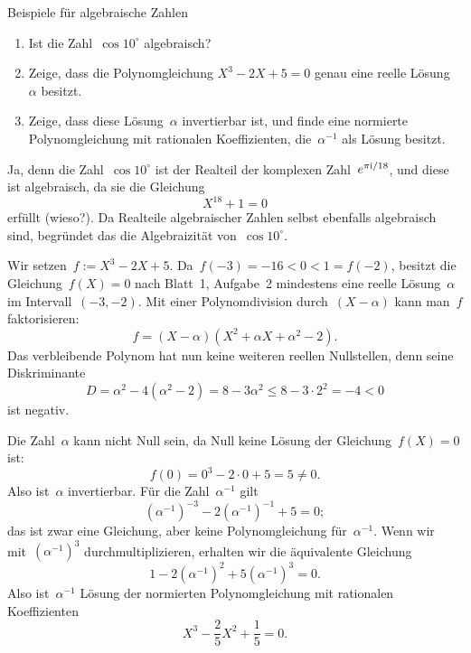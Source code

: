 \documentclass{algblatt}
\begin{document}
\vspace*{-1.5cm}

\begin{aufgabe}{Beispiele für algebraische Zahlen}
\begin{enumerate}
\item Ist die Zahl~$\cos 10^\circ$ algebraisch?
\item Zeige, dass die Polynomgleichung $X^3 - 2X + 5 = 0$ genau eine reelle
Lösung~$\alpha$ besitzt.
\item Zeige, dass diese Lösung~$\alpha$ invertierbar ist, und finde eine normierte
Polynomgleichung mit rationalen Koeffizienten, die~$\alpha^{-1}$ als Lösung besitzt.
\end{enumerate}
\begin{loesungE}
\item Ja, denn die Zahl~$\cos 10^\circ$ ist der Realteil der komplexen
Zahl~$e^{\pi\mathrm{i}/18}$, und diese ist algebraisch, da sie die Gleichung
\[ X^{18} + 1 = 0 \]
erfüllt (wieso?). Da Realteile algebraischer Zahlen selbst ebenfalls
algebraisch sind, begründet das die Algebraizität von~$\cos 10^\circ$.
\item Wir setzen~$f := X^3-2X+5$. Da~$f(-3) =
-16 < 0 < 1 = f(-2)$, besitzt die Gleichung~$f(X) = 0$ nach Blatt~1, Aufgabe~2
mindestens eine reelle Lösung~$\alpha$ im Intervall~$(-3, -2)$. Mit einer Polynomdivision
durch~$(X-\alpha)$ kann man~$f$ faktorisieren:
\[ f = (X - \alpha) (X^2 + \alpha X + \alpha^2-2). \]
Das verbleibende Polynom hat nun keine weiteren reellen Nullstellen, denn seine
Diskriminante
\[ D = \alpha^2 - 4(\alpha^2-2) = 8 - 3 \alpha^2 \leq 8 - 3 \cdot 2^2 = -4 < 0
\]
ist negativ.
\item Die Zahl~$\alpha$ kann nicht Null sein, da Null keine Lösung der
Gleichung~$f(X) = 0$ ist:
\[ f(0) = 0^3 - 2 \cdot 0 + 5 = 5 \neq 0. \]
Also ist~$\alpha$ invertierbar. Für die Zahl~$\alpha^{-1}$ gilt
\[ (\alpha^{-1})^{-3} - 2 (\alpha^{-1})^{-1} + 5 = 0; \]
das ist zwar eine Gleichung, aber keine Polynomgleichung für~$\alpha^{-1}$.
Wenn wir mit~$(\alpha^{-1})^3$ durchmultiplizieren, erhalten wir die
äquivalente Gleichung
\[ 1 - 2 (\alpha^{-1})^2 + 5 (\alpha^{-1})^3 = 0. \]
Also ist~$\alpha^{-1}$ Lösung der normierten Polynomgleichung mit rationalen
Koeffizienten
\[ X^3 - \frac{2}{5} X^2 + \frac{1}{5} = 0. \]
\end{loesungE}
\end{aufgabe}
\end{document}
